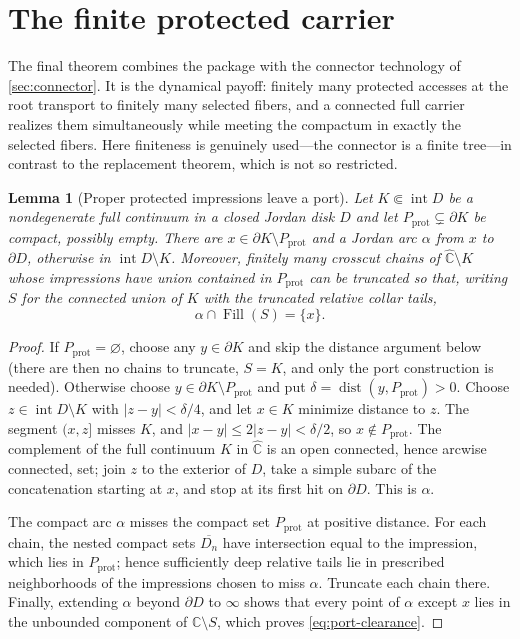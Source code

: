 \documentclass[11pt,reqno]{amsart}
\numberwithin{equation}{section}
\theoremstyle{plain}
\newtheorem{lemma}[theorem]{Lemma}
\theoremstyle{definition}
\theoremstyle{remark}
\DeclareMathOperator{\Fill}{Fill}
\newcommand{\Chat}{\widehat{\mathbb C}}
\newcommand{\C}{\mathbb C}
\begin{document}
\section{The finite protected carrier}
\label{sec:carrier}

The final theorem combines the package with the connector technology of
\cref{sec:connector}.  It is the dynamical payoff: finitely many
protected accesses at the root transport to finitely many selected
fibers, and a connected full carrier realizes them simultaneously while
meeting the compactum in exactly the selected fibers.  Here finiteness
is genuinely used---the connector is a finite tree---in contrast to the
replacement theorem, which is not so restricted.

\begin{lemma}[Proper protected impressions leave a port]
\label{lem:impression-port}
Let $K\Subset\operatorname{int}D$ be a nondegenerate full continuum in a
closed Jordan disk $D$ and let
$P_{\mathrm{prot}}\subsetneq\partial K$ be compact, possibly empty.
There are $x\in\partial K\setminus P_{\mathrm{prot}}$ and a Jordan arc
$\alpha$ from $x$ to $\partial D$, otherwise in
$\operatorname{int}D\setminus K$.  Moreover, finitely many crosscut
chains of $\Chat\setminus K$ whose impressions have union contained in
$P_{\mathrm{prot}}$ can be truncated so that, writing $S$ for the
connected union of $K$ with the truncated relative collar tails,
\begin{equation}
 \alpha\cap\Fill(S)=\{x\}.
\label{eq:port-clearance}
\end{equation}
\end{lemma}

\begin{proof}
If $P_{\mathrm{prot}}=\varnothing$, choose any $y\in\partial K$ and
skip the distance argument below (there are then no chains to
truncate, $S=K$, and only the port construction is needed).  Otherwise
choose $y\in\partial K\setminus P_{\mathrm{prot}}$ and put
$\delta=\operatorname{dist}(y,P_{\mathrm{prot}})>0$.  Choose
$z\in\operatorname{int}D\setminus K$ with $|z-y|<\delta/4$, and let
$x\in K$ minimize distance to $z$.  The segment $(x,z]$ misses $K$, and
$|x-y|\le2|z-y|<\delta/2$, so
$x\notin P_{\mathrm{prot}}$.  The complement of the full continuum $K$
in $\Chat$ is an open connected, hence arcwise connected, set; join $z$
to the exterior of $D$, take a simple subarc of the concatenation
starting at $x$, and stop at its first hit on $\partial D$.  This is
$\alpha$.

The compact arc $\alpha$ misses the compact set $P_{\mathrm{prot}}$ at
positive distance.  For each chain, the nested compact sets
$\overline{D_n}$ have intersection equal to the impression, which lies
in $P_{\mathrm{prot}}$; hence sufficiently deep relative tails lie in
prescribed neighborhoods of the impressions chosen to miss $\alpha$.
Truncate each chain there.  Finally, extending $\alpha$ beyond
$\partial D$ to $\infty$ shows that every point of $\alpha$ except $x$
lies in the unbounded component of $\C\setminus S$, which proves
\eqref{eq:port-clearance}.
\end{proof}
\end{document}
